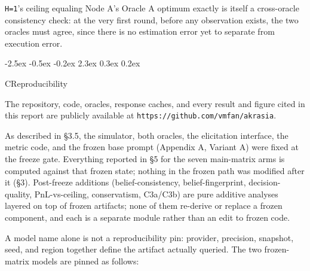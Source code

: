 \documentclass[
  11pt,
]{article}
\makeatletter
\newcounter{none} %
\renewcommand{\section}{%
  \@startsection{section}{1}{\z@}%
                {-2.5ex \@plus -0.5ex \@minus -0.2ex}%
                { 2.3ex \@plus  0.3ex \@minus  0.2ex}%
                {\large\bf\raggedright}%
}
\makeatother
\begin{document}
\texttt{H=1}'s ceiling equaling Node A's Oracle A optimum exactly is itself a cross-oracle consistency check: at the very first round, before any observation exists, the two oracles must agree, since there is no estimation error yet to separate from execution error.

\section{C\quad Reproducibility}\label{c-reproducibility}

The repository, code, oracles, response caches, and every result and figure cited in this report are publicly available at \texttt{https://github.com/vmfan/akrasia}.

As described in §3.5, the simulator, both oracles, the elicitation interface, the metric code, and the frozen base prompt (Appendix A, Variant A) were fixed at the freeze gate. Everything reported in §5 for the seven main-matrix arms is computed against that frozen state; nothing in the frozen path was modified after it (§3). Post-freeze additions (belief-consistency, belief-fingerprint, decision-quality, PnL-vs-ceiling, conservatism, C3a/C3b) are pure additive analyses layered on top of frozen artifacts; none of them re-derive or replace a frozen component, and each is a separate module rather than an edit to frozen code.

A model name alone is not a reproducibility pin: provider, precision, snapshot, seed, and region together define the artifact actually queried. The two frozen-matrix models are pinned as follows:
\end{document}

